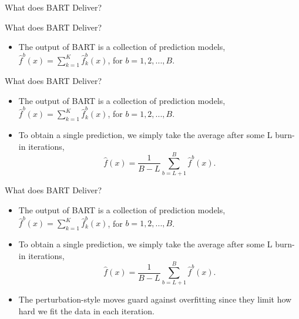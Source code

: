 \documentclass[aspectratio=169, 11pt]{beamer}
\begin{document}
\begin{frame}{What does BART Deliver?}
\end{frame}

\begin{frame}{What does BART Deliver?}
\begin{itemize}
    \item The output of BART is a collection of prediction models, $\hat{f}^{b}(x)=\sum_{k=1}^{K}\hat{f}_{k}^{b}(x)$, for $b=1,2,...,B$.
\end{itemize}
\end{frame}

\begin{frame}{What does BART Deliver?}
\begin{itemize}
    \item The output of BART is a collection of prediction models, $\hat{f}^{b}(x)=\sum_{k=1}^{K}\hat{f}_{k}^{b}(x)$, for $b=1,2,...,B$.
    \item To obtain a single prediction, we simply take the average after some L burn-in iterations, 
    \begin{equation*}
    \hat{f}(x)=\frac{1}{B-L}\sum_{b=L+1}^{B}\hat{f}^{b}(x).
    \end{equation*}
\end{itemize}
\end{frame}

\begin{frame}{What does BART Deliver?}
\begin{itemize}
    \item The output of BART is a collection of prediction models, $\hat{f}^{b}(x)=\sum_{k=1}^{K}\hat{f}_{k}^{b}(x)$, for $b=1,2,...,B$.
    \item To obtain a single prediction, we simply take the average after some L burn-in iterations, 
    \begin{equation*}
    \hat{f}(x)=\frac{1}{B-L}\sum_{b=L+1}^{B}\hat{f}^{b}(x).
    \end{equation*}
    \item The perturbation-style moves guard against overfitting since they limit how hard we fit the data in each iteration.
\end{itemize}
\end{frame}
\end{document}
